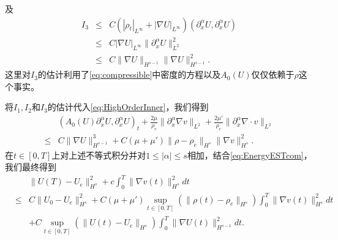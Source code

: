 \documentclass{article}
\begin{document}
及
\begin{eqnarray*}
  I_3 &\le& C (|\rho_t|_{L^\infty} + |\nabla U|_{L^\infty}) (\partial_x^\alpha U,\partial_x^\alpha U) \\
      &\le& C |\nabla U|_{L^\infty} \|\partial_x^\alpha U\|_{L^2}^2 \\
      &\le& C \|\nabla U\|_{H^{s-1}} \|\nabla U\|_{H^{s-1}}^2.
\end{eqnarray*}
这里对$I_3$的估计利用了\eqref{eq:compressible}中密度的方程以及$A_0(U)$仅仅依赖于$\rho$这个事实。

将$I_1, I_2$和$I_3$的估计代入\eqref{eq:HighOrderInner}，我们得到
\begin{eqnarray*}
  & (A_0(U)\partial_x^\alpha U,\partial_x^\alpha U)_t + \frac{2\mu}{\rho_e} \|\partial_x^\alpha \nabla  v \|_{L^2}  + \frac{2\mu'}{\rho_e} \|\partial_x^\alpha \nabla \cdot  v \|_{L^2}   \\
\le &C \| \nabla U\|_{H^{s-1}}^3 + C(\mu+\mu')\|\rho -\rho_e\|_{H^s} \|\nabla  v \|_{H^s}^2.\nonumber
\end{eqnarray*}
在$ t\in [0,T]$上对上述不等式积分并对$1 \le |\alpha| \le s$相加，结合\eqref{eq:EnergyESTcom}，我们最终得到
\begin{eqnarray}\label{eq:Step2Resultcom}
  && \| U(T) - U_e\|_{H^s}^2 + c\int_0^T \|\nabla  v  (t)\|_{H^s}^2 dt  \\
  &\le& C \|U_0 - U_e\|_{H^s}^2+ C (\mu + \mu') \sup_{t \in [0,T]} (\|\rho(t) -\rho_e\|_{H^s}) \int_0^T \|\nabla  v (t)\|_{H^s}^2 dt \nonumber\\
  &&+ C \sup_{t \in [0,T]} (\|U(t) - U_e\|_{H^s}) \int_0^T \|\nabla U(t)\|_{H^{s-1}}^2 dt . \nonumber
\end{eqnarray}
\end{document}
